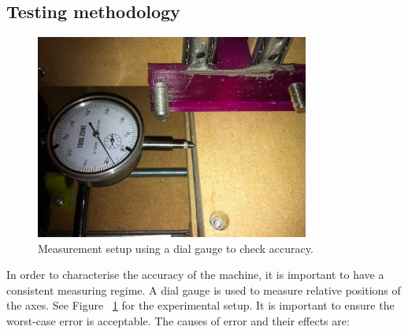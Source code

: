 


\subsection{Testing methodology}

\begin{figure}[ht!]
\centering
\includegraphics[width=90mm]{resources/dial.jpg}
\caption{Measurement setup using a dial gauge to check accuracy.}
\label{dialgauge}
\end{figure}

In order to characterise the accuracy of the machine, it is important to have a consistent measuring regime. A dial gauge is used to measure
relative positions of the axes. See Figure ~\ref{dialgauge} for the experimental setup. It is important to ensure the worst-case error is acceptable. The causes of error and their effects are:


